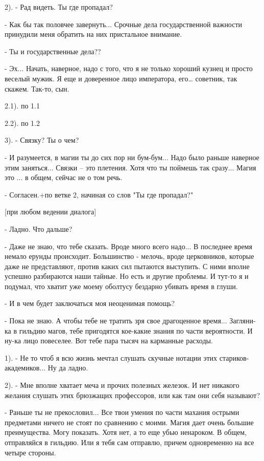 \documentclass[12pt,a4paper]{book}
\begin{document}
2). - Рад видеть. Ты где пропадал?

- Как бы так половчее завернуть... Срочные дела государственной важности принудили меня обратить на них пристальное внимание.

- Ты и государственные дела??

- Эх... Начать, наверное, надо с того, что я не только хороший кузнец и просто веселый мужик. Я еще и доверенное лицо императора, его… советник, так скажем. Так-то, сын.

2.1). по 1.1

2.2). по 1.2

3). - Связку? Ты о чем?

- И разумеется, в магии ты до сих пор ни бум-бум... Надо было раньше наверное этим заняться... Связки – это плетения. Хотя что ты поймешь так сразу... Магия это ... в общем, сейчас не о том речь.

- Согласен.+по ветке 2, начиная со слов "Ты где пропадал?"

[при любом ведении диалога]

- Ладно. Что дальше?

- Даже не знаю, что тебе сказать. Вроде много всего надо... В последнее время немало ерунды происходит. Большинство - мелочь, вроде церковников, которые даже не представляют, против каких сил пытаются выступить. С ними вполне успешно разбираются наши тайные. Но есть и другие проблемы. И тут-то я и подумал, что хватит уже моему оболтусу бездарно убивать время в глуши.

- И в чем будет заключаться моя неоценимая помощь?

- Пока не знаю. А чтобы тебе не тратить зря свое драгоценное время... Загляни-ка в гильдию магов, тебе пригодятся кое-какие знания по части вероятности. И ну-ка лицо повеселее. Вот тебе пара тысяч на карманные расходы.

1). - Не то чтоб я всю жизнь мечтал слушать скучные нотации этих стариков-академиков... Ну да ладно.

2). - Мне вполне хватает меча и прочих полезных железок. И нет никакого желания слушать этих брюзжащих профессоров, или как там они себя называют?

- Раньше ты не прекословил... Все твои умения по части махания острыми предметами ничего не стоят по сравнению с моими. Магия дает очень большие преимущества. Могу показать. Хотя нет, а то еще убью ненароком. В общем, отправляйся в гильдию. Или я тебя сам отправлю, причем одновременно на все четыре стороны.
\end{document}

